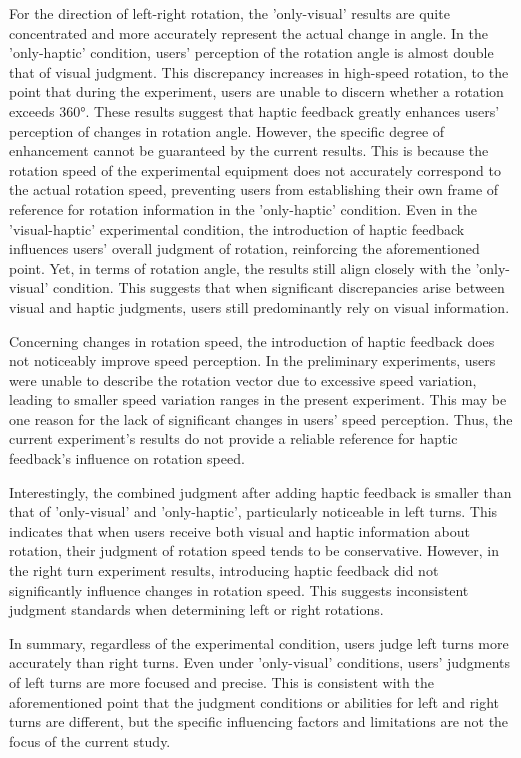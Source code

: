 For the direction of left-right rotation, the 'only-visual' results are quite concentrated and more accurately represent the actual change in angle. In the 'only-haptic' condition, users' perception of the rotation angle is almost double that of visual judgment. This discrepancy increases in high-speed rotation, to the point that during the experiment, users are unable to discern whether a rotation exceeds 360°. These results suggest that haptic feedback greatly enhances users' perception of changes in rotation angle. However, the specific degree of enhancement cannot be guaranteed by the current results. This is because the rotation speed of the experimental equipment does not accurately correspond to the actual rotation speed, preventing users from establishing their own frame of reference for rotation information in the 'only-haptic' condition. Even in the 'visual-haptic' experimental condition, the introduction of haptic feedback influences users' overall judgment of rotation, reinforcing the aforementioned point. Yet, in terms of rotation angle, the results still align closely with the 'only-visual' condition. This suggests that when significant discrepancies arise between visual and haptic judgments, users still predominantly rely on visual information.

Concerning changes in rotation speed, the introduction of haptic feedback does not noticeably improve speed perception. In the preliminary experiments, users were unable to describe the rotation vector due to excessive speed variation, leading to smaller speed variation ranges in the present experiment. This may be one reason for the lack of significant changes in users' speed perception. Thus, the current experiment's results do not provide a reliable reference for haptic feedback's influence on rotation speed.

Interestingly, the combined judgment after adding haptic feedback is smaller than that of 'only-visual' and 'only-haptic', particularly noticeable in left turns. This indicates that when users receive both visual and haptic information about rotation, their judgment of rotation speed tends to be conservative. However, in the right turn experiment results, introducing haptic feedback did not significantly influence changes in rotation speed. This suggests inconsistent judgment standards when determining left or right rotations.

In summary, regardless of the experimental condition, users judge left turns more accurately than right turns. Even under 'only-visual' conditions, users' judgments of left turns are more focused and precise. This is consistent with the aforementioned point that the judgment conditions or abilities for left and right turns are different, but the specific influencing factors and limitations are not the focus of the current study.

